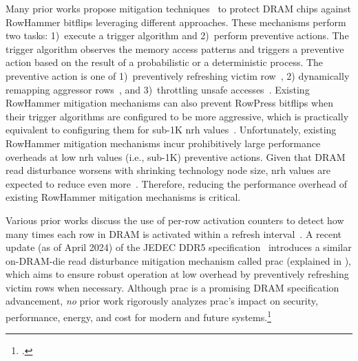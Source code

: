 Many prior works propose mitigation techniques~\mitigatingRowHammerAllCitations{} to protect DRAM chips against RowHammer bitflips leveraging different approaches.
These mechanisms perform two tasks: 1)~execute a trigger algorithm and 2)~perform preventive actions.
The trigger algorithm observes the memory access patterns and triggers a preventive action based on the result of a probabilistic or a deterministic process. The preventive action is one of  1)~preventively refreshing victim row~,
2) dynamically remapping aggressor rows~\cite{saileshwar2022randomized, saxena2022aqua, wi2023shadow, woo2023scalable}, and
3)~throttling unsafe accesses~\cite{greenfield2012throttling, yaglikci2021blockhammer}.
Existing RowHammer mitigation mechanisms can also prevent RowPress bitflips when their trigger algorithms are configured to be more aggressive, which is practically equivalent to configuring them for sub-1K \gls{nrh} values~\cite{luo2023rowpress}.
Unfortunately, existing RowHammer mitigation mechanisms incur prohibitively large performance overheads at low \gls{nrh} values (i.e., sub-1K)  preventive actions.
Given that DRAM read disturbance worsens with shrinking technology node size, \gls{nrh} values are expected to reduce even more~\cite{yaglikci2024spatial, kim2014flipping, orosa2021deeper}.
Therefore, reducing the performance overhead of existing RowHammer mitigation mechanisms is critical.

Various prior works discuss the use of per-row activation counters to detect how many times each row in DRAM is activated within a refresh interval~\cite{kim2014flipping,kim2014architectural,bennett2021panopticon,kim2023ddr5,yaglikci2021security}.
A recent update (as of April 2024) of the JEDEC DDR5 specification~\cite{saroiu2024ddr5, jedec2024jesd795c} introduces a similar on-DRAM-die read disturbance mitigation mechanism called \gls{prac} (explained in ), which aims to ensure robust operation at low overhead by preventively refreshing victim rows when necessary.
Although \gls{prac} is a promising DRAM specification advancement, \emph{no} prior work rigorously analyzes \gls{prac}'s impact on security, performance, energy, and cost for modern and future systems.\footnote{.}